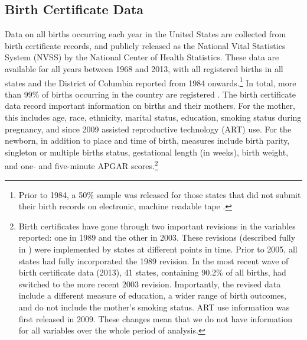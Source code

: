 \documentclass[a4paper, 11.5 pt]{article}
\theoremstyle{plain}
\begin{document}
\begin{doublespace}
\subsection{Birth Certificate Data}
\label{bqSscn:USAdata}
Data on all births occurring each year in the United States are collected from birth certificate records, and publicly released as the National Vital Statistics System (NVSS) by the National Center of Health Statistics. These data are available for all years between 1968 and 2013, with all registered births in all states and the District of Columbia reported from 1984 onwards.\footnote{Prior to 1984, a 50\% sample was released for those states that did not submit their birth records on electronic, machine readable tape \citep{Martinetal2015}.}  In total, more than 99\% of births occurring in the country are registered \citep{Martinetal2015}. The birth certificate data record important information on births and their mothers. For the mother, this includes age, race, ethnicity, marital status, education, smoking status during pregnancy, and since 2009 assisted reproductive technology (ART) use. For the newborn, in addition to place and time of birth, measures include birth parity, singleton or multiple births status, gestational length (in weeks), birth weight, and one- and five-minute APGAR scores.\footnote{Birth certificates have gone through two important revisions in the variables reported: one in 1989 and the other in 2003.  These revisions (described fully in \citealp{NCHS2000}) were implemented by states at different points in time.  Prior to 2005, all states had fully incorporated the 1989 revision.  In the most recent wave of birth certificate data (2013), 41 states, containing 90.2\% of all births, had switched to the more recent 2003 revision.  Importantly, the revised data include a different measure of education, a wider range of birth outcomes, and do not include the mother's smoking status. ART use information was first released in 2009. These changes mean that we do not have information for all variables over the whole period of analysis.} %



\end{doublespace}
\end{document}
